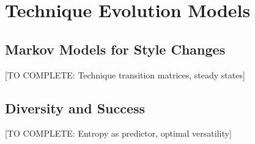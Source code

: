 \section{Technique Evolution Models}

\subsection{Markov Models for Style Changes}

[TO COMPLETE: Technique transition matrices, steady states]

\subsection{Diversity and Success}

[TO COMPLETE: Entropy as predictor, optimal versatility]